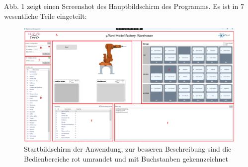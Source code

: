         Abb. 1 zeigt einen Screenshot des Hauptbildschirm des Programms. Es ist in 7 wesentliche Teile eingeteilt:
    \begin{figure}[h]
        \label{fig:figure}
        \includegraphics[width = \textwidth ]{Bilder/LV_Startbildschirm}
        \caption[Ansicht des Startbildschirms]%
        {\small Startbildschirm der Anwendung, zur besseren Beschreibung sind die Bedienbereiche rot umrandet und mit
        Buchstanben gekennzeichnet}
        \centering
    \end{figure}

